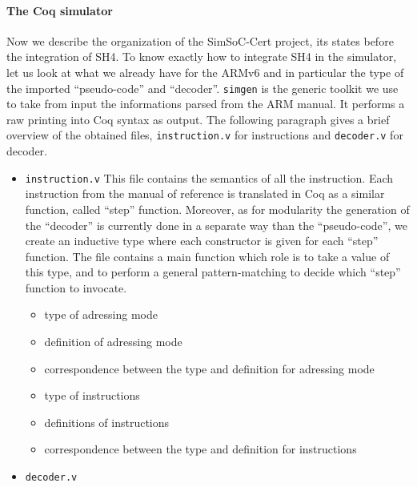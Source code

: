 \documentclass[a4paper, 11pt]{article}
\newcommand{\simgen}{{\tt simgen}\xspace}
\begin{document}
\paragraph{The Coq simulator}
Now we describe the organization of the SimSoC-Cert project, its states before the integration of SH4. To know exactly how to integrate SH4 in the simulator, let us look at what we already have for the ARMv6 and in particular the type of the imported ``pseudo-code'' and ``decoder''.
\simgen is the generic toolkit we use to take from input the informations parsed from the ARM manual. It performs a raw printing into Coq syntax as output. The following paragraph gives a brief overview of the obtained files, \verb|instruction.v| for instructions and \verb|decoder.v| for decoder.
\begin{itemize}
\item \verb|instruction.v|
This file contains the semantics of all the instruction. Each instruction from the manual of reference is translated in Coq as a similar function, called ``step'' function. Moreover, as for modularity the generation of the ``decoder'' is currently done in a separate way than the ``pseudo-code'', we create an inductive type where each constructor is given for each ``step'' function.
The file contains a main function which role is to take a value of this type, and to perform a general pattern-matching to decide which ``step'' function to invocate.

  \begin{itemize}
  \item type of adressing mode
  \item definition of adressing mode
  \item correspondence between the type and definition for adressing mode
  \item type of instructions
  \item definitions of instructions
  \item correspondence between the type and definition for instructions
  \end{itemize}
\item \verb|decoder.v|

\end{itemize}
\end{document}
